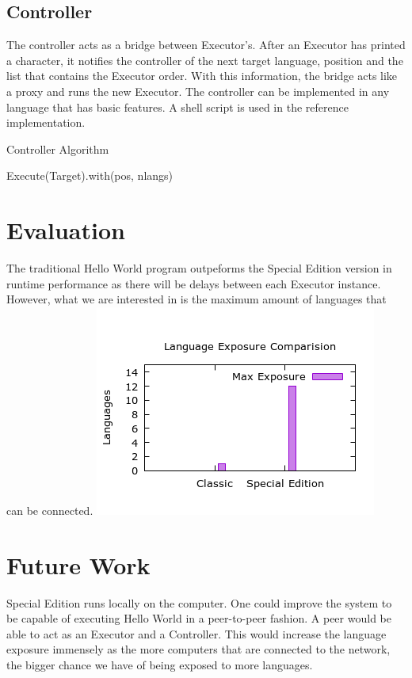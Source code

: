 \documentclass[11pt]{article}
\begin{document}
\subsection{Controller}
The controller acts as a bridge between Executor's. After an Executor has printed a character, it notifies the controller of the next target language, position and the list that contains the Executor order. With this information, the bridge acts like a proxy and runs the new Executor. The controller can be implemented in any language that has basic features. A shell script is used in the reference implementation.
\vfill
\raggedbottom

\begin{algorithm}[H]
\caption{Controller Algorithm}
\label{Special Edition}
\begin{algorithmic}[2]
	\State Execute(Target).with(pos, nlangs)
\EndProcedure
\end{algorithmic}
\end{algorithm}

\section{Evaluation}
The traditional Hello World program outpeforms the Special Edition version in runtime performance as there will be delays between each Executor instance. However, what we are interested in is the maximum amount of languages that can be connected.
\includegraphics[scale=0.65]{img/exposure.png}


\section{Future Work}
Special Edition runs locally on the computer. One could improve the system to be capable of executing Hello World in a peer-to-peer fashion. A peer would be able to act as an Executor and a Controller. This would increase the language exposure immensely as the more computers that are connected to the network, the bigger chance we have of being exposed to more languages.
\end{document}
